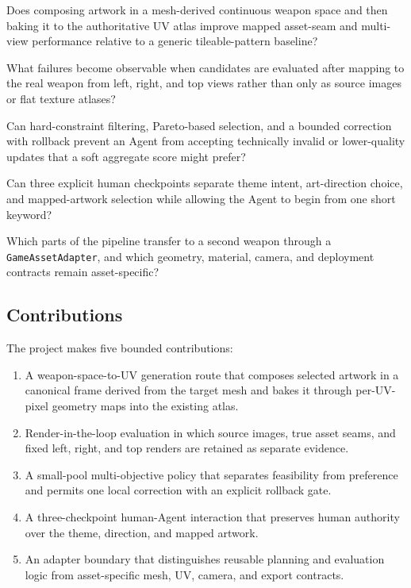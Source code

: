 \begin{description}[leftmargin=1.2cm,style=nextline]
  \item[RQ1] Does composing artwork in a mesh-derived continuous weapon space and
  then baking it to the authoritative UV atlas improve mapped asset-seam and
  multi-view performance relative to a generic tileable-pattern baseline?

  \item[RQ2] What failures become observable when candidates are evaluated after
  mapping to the real weapon from left, right, and top views rather than only as
  source images or flat texture atlases?

  \item[RQ3] Can hard-constraint filtering, Pareto-based selection, and a bounded
  correction with rollback prevent an Agent from accepting technically invalid or
  lower-quality updates that a soft aggregate score might prefer?

  \item[RQ4] Can three explicit human checkpoints separate theme intent,
  art-direction choice, and mapped-artwork selection while allowing the Agent to
  begin from one short keyword?

  \item[RQ5] Which parts of the pipeline transfer to a second weapon through a
  \texttt{GameAssetAdapter}, and which geometry, material, camera, and deployment
  contracts remain asset-specific?
\end{description}

\subsection{Contributions}

The project makes five bounded contributions:

\begin{enumerate}
  \item A weapon-space-to-UV generation route that composes selected artwork in a
  canonical frame derived from the target mesh and bakes it through per-UV-pixel
  geometry maps into the existing atlas.
  \item Render-in-the-loop evaluation in which source images, true asset seams,
  and fixed left, right, and top renders are retained as separate evidence.
  \item A small-pool multi-objective policy that separates feasibility from
  preference and permits one local correction with an explicit rollback gate.
  \item A three-checkpoint human-Agent interaction that preserves human authority
  over the theme, direction, and mapped artwork.
  \item An adapter boundary that distinguishes reusable planning and evaluation
  logic from asset-specific mesh, UV, camera, and export contracts.
\end{enumerate}

